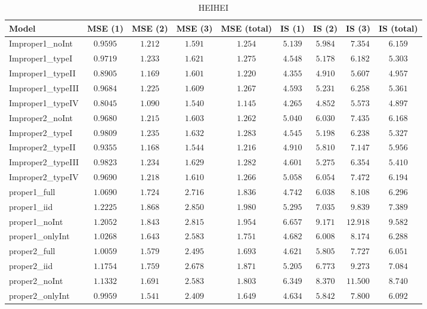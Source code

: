 \begin{table}

\caption{\label{tab:model-choice-sc6}HEIHEI}
\centering
\begin{tabular}{lcccccccc}
\hline
Model  & MSE (1) & MSE (2) & MSE (3) & MSE (total) & IS (1) & IS (2) & IS (3) & \multicolumn{1}{c}{IS (total)} \\ 
\hline
Improper1_noInt  & $0.9595$ & $1.212$ & $1.591$ & $1.254$ & $5.139$ & $5.984$ & $\phantom{0}7.354$ & $6.159$ \\
Improper1_typeI  & $0.9719$ & $1.233$ & $1.621$ & $1.275$ & $4.548$ & $5.178$ & $\phantom{0}6.182$ & $5.303$ \\
Improper1_typeII  & $0.8905$ & $1.169$ & $1.601$ & $1.220$ & $4.355$ & $4.910$ & $\phantom{0}5.607$ & $4.957$ \\
Improper1_typeIII  & $0.9684$ & $1.225$ & $1.609$ & $1.267$ & $4.593$ & $5.231$ & $\phantom{0}6.258$ & $5.361$ \\
Improper1_typeIV  & $0.8045$ & $1.090$ & $1.540$ & $1.145$ & $4.265$ & $4.852$ & $\phantom{0}5.573$ & $4.897$ \\
Improper2_noInt  & $0.9680$ & $1.215$ & $1.603$ & $1.262$ & $5.040$ & $6.030$ & $\phantom{0}7.435$ & $6.168$ \\
Improper2_typeI  & $0.9809$ & $1.235$ & $1.632$ & $1.283$ & $4.545$ & $5.198$ & $\phantom{0}6.238$ & $5.327$ \\
Improper2_typeII  & $0.9355$ & $1.168$ & $1.544$ & $1.216$ & $4.910$ & $5.810$ & $\phantom{0}7.147$ & $5.956$ \\
Improper2_typeIII  & $0.9823$ & $1.234$ & $1.629$ & $1.282$ & $4.601$ & $5.275$ & $\phantom{0}6.354$ & $5.410$ \\
Improper2_typeIV  & $0.9690$ & $1.218$ & $1.610$ & $1.266$ & $5.058$ & $6.054$ & $\phantom{0}7.472$ & $6.194$ \\
proper1_full  & $1.0690$ & $1.724$ & $2.716$ & $1.836$ & $4.742$ & $6.038$ & $\phantom{0}8.108$ & $6.296$ \\
proper1_iid  & $1.2225$ & $1.868$ & $2.850$ & $1.980$ & $5.295$ & $7.035$ & $\phantom{0}9.839$ & $7.389$ \\
proper1_noInt  & $1.2052$ & $1.843$ & $2.815$ & $1.954$ & $6.657$ & $9.171$ & $12.918$ & $9.582$ \\
proper1_onlyInt  & $1.0268$ & $1.643$ & $2.583$ & $1.751$ & $4.682$ & $6.008$ & $\phantom{0}8.174$ & $6.288$ \\
proper2_full  & $1.0059$ & $1.579$ & $2.495$ & $1.693$ & $4.621$ & $5.805$ & $\phantom{0}7.727$ & $6.051$ \\
proper2_iid  & $1.1754$ & $1.759$ & $2.678$ & $1.871$ & $5.205$ & $6.773$ & $\phantom{0}9.273$ & $7.084$ \\
proper2_noInt  & $1.1332$ & $1.691$ & $2.583$ & $1.803$ & $6.349$ & $8.370$ & $11.500$ & $8.740$ \\
proper2_onlyInt  & $0.9959$ & $1.541$ & $2.409$ & $1.649$ & $4.634$ & $5.842$ & $\phantom{0}7.800$ & $6.092$ \\
\hline 
\end{tabular}

\end{table}